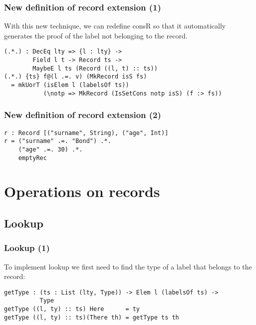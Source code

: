 \documentclass{beamer}
\begin{document}
\begin{frame}[fragile]
\frametitle{New definition of record extension (1)}

With this new technique, we can redefine consR so that it automatically generates the proof of the label not belonging to the record.

\pause

\begin{definition}
\begin{verbatim}
(.*.) : DecEq lty => {l : lty} ->
        Field l t -> Record ts ->
        MaybeE l ts (Record ((l, t) :: ts))
(.*.) {ts} f@(l .=. v) (MkRecord isS fs)
  = mkUorT (isElem l (labelsOf ts))
           (\notp => MkRecord (IsSetCons notp isS) (f :> fs))
\end{verbatim}
\end{definition}

\end{frame}

\begin{frame}[fragile]
\frametitle{New definition of record extension (2)}

\begin{example}
\begin{verbatim}
r : Record [("surname", String), ("age", Int)]
r = ("surname" .=. "Bond") .*.
    ("age" .=. 30) .*.
    emptyRec
\end{verbatim}
\end{example}

\end{frame}

\section{Operations on records}

\subsection{Lookup}

\begin{frame}[fragile]
\frametitle{Lookup (1)}

To implement lookup we first need to find the type of a label that belongs to the record:

\begin{definition}
\begin{verbatim}
getType : (ts : List (lty, Type)) -> Elem l (labelsOf ts) -> 
          Type
getType ((l, ty) :: ts) Here      = ty
getType ((l, ty) :: ts)(There th) = getType ts th
\end{verbatim}
\end{definition}

\end{frame}
\end{document}

